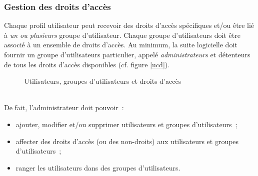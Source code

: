 \subsubsection{Gestion des droits d'accès}
Chaque profil utilisateur peut recevoir des droits d'accès spécifiques et/ou être lié à \emph{un ou plusieurs} groupe d'utilisateur.
Chaque groupe d'utilisateurs doit être associé à un ensemble de droits d'accès.
Au minimum, la suite logicielle doit fournir un groupe d'utilisateurs particulier, appelé \emph{administrateurs} et détenteurs de tous les droits d'accès disponibles (cf. figure \ref{ucd}).
\begin{figure}[htbp] %
	\centering
	\caption{Utilisateurs, groupes d'utilisateurs et droits d'accès}
	\label{ar}
\end{figure}
\\
De fait, l'administrateur doit pouvoir~:
\begin{itemize}
	\item ajouter, modifier et/ou supprimer utilisateurs et groupes d'utilisateurs~;
	\item affecter des droits d'accès (ou des non-droits) aux utilisateurs et groupes d'utilisateurs~;
	\item ranger les utilisateurs dans des groupes d'utilisateurs.
\end{itemize}
